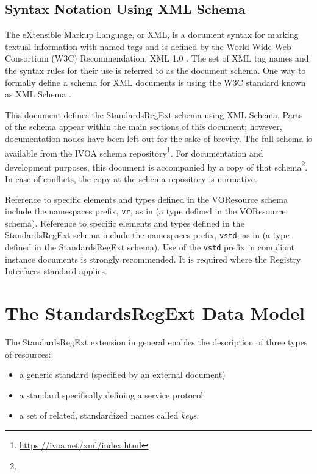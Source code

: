 \documentclass[11pt,a4paper]{ivoa}
\begin{document}
\subsection{Syntax Notation Using XML Schema}
The eXtensible Markup Language, or XML, is a document syntax for marking
textual information with named tags and is defined by the
World Wide Web Consortium (W3C) Recommendation,
XML 1.0 \citep{std:XML}.
The set of XML tag names and the syntax
rules for their use is referred to as the document schema.  One way to
formally define a schema for XML documents is using the W3C standard
known as XML Schema \citep{std:XSD}.


This document defines the StandardsRegExt schema using XML Schema.
Parts of the schema appear within the main sections of this document;
however, documentation nodes have been left out for the sake of brevity.
The full schema is available from the IVOA schema
repository\footnote{\url{https://ivoa.net/xml/index.html}}.  For
documentation and development purposes, this document is accompanied by
a copy of that
schema\footnote{}.  In case of
conflicts, the copy at the schema repository is normative.

Reference to specific elements and types defined in the VOResource
schema include the namespaces prefix, \texttt{vr}, as in
 (a type defined in the VOResource schema).
Reference to specific elements and types defined in the StandardsRegExt
schema include the namespaces prefix, \texttt{vstd}, as in
 (a type defined in the StandardsRegExt schema).
Use of the \texttt{vstd} prefix in compliant instance documents is
strongly recommended.  It is required where the Registry Interfaces
standard \citep{2018ivoa.spec.0723D} applies.




\section{The StandardsRegExt Data Model}

The StandardsRegExt extension in general enables the description of three
types of resources:

\begin{itemize}
\item  a generic standard (specified by an external document)
\item  a standard specifically defining a service protocol
\item  a set of related, standardized names called \emph{keys}.
\end{itemize}
\end{document}
